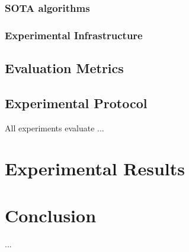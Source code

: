 \documentclass[twocolumn]{svjour3}          %
\begin{document}
\subsubsection{SOTA algorithms}

\subsubsection{Experimental Infrastructure}


\subsection{Evaluation Metrics}

\subsection{Experimental Protocol}

All experiments evaluate ...

\section{Experimental Results}
\label{sec:experimental_results}


\section{Conclusion}
...

\printbibliography
\end{document}
